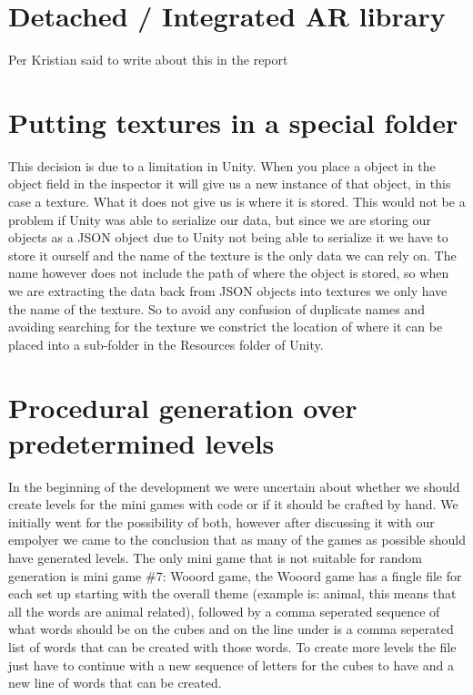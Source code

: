 \section{Detached / Integrated AR library}
Per Kristian said to write about this in the report

\section{Putting textures in a special folder}
This decision is due to a limitation in Unity. When you place a object in the object field in the inspector it will give us a new instance of that object, in this case a texture. What it does not give us is where it is stored. This would not be a problem if Unity was able to serialize our data, but since we are storing our objects as a JSON object due to Unity not being able to serialize it we have to store it ourself and the name of the texture is the only data we can rely on. The name however does not include the path of where the object is stored, so when we are extracting the data back from JSON objects into textures we only have the name of the texture. So to avoid any confusion of duplicate names and avoiding searching for the texture we constrict the location of where it can be placed into a sub-folder in the Resources folder of Unity.

\section{Procedural generation over predetermined levels}
In the beginning of the development we were uncertain about whether we should create levels for the mini games with code or if it should be crafted by hand. We initially went for the possibility of both, however after discussing it with our empolyer we came to the conclusion that as many of the games as possible should have generated levels. The only mini game that is not suitable for random generation is mini game \#7: Wooord game, the Wooord game has a fingle file for each set up starting with the overall theme (example is: animal, this means that all the words are animal related), followed by a comma seperated sequence of what words should be on the cubes and on the line under is a comma seperated list of words that can be created with those words. To create more levels the file just have to continue with a new sequence of letters for the cubes to have and a new line of words that can be created.
